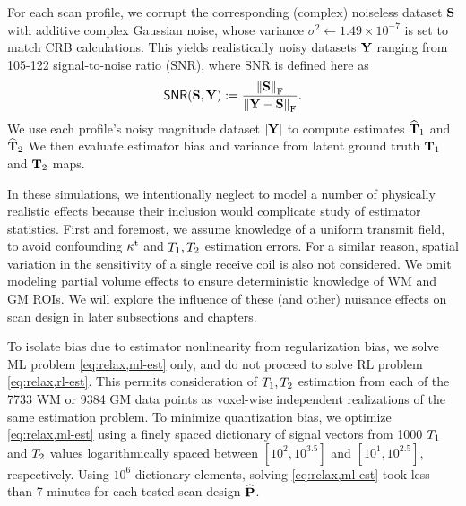 For each scan profile, 
we corrupt the corresponding (complex) noiseless dataset $\mathbf{S}$ 
with additive complex Gaussian noise, 
whose variance $\sigma^2 \gets 1.49 \times 10^{-7}$ 
is set to match CRB calculations. 
This yields realistically noisy datasets $\mathbf{Y}$ ranging 
from 105-122 signal-to-noise ratio (SNR), 
where SNR is defined here as
\begin{align}
	\snr{\bmS,\bmY} := \frac{\frob{\bmS}}{\frob{\bmY-\bmS}}.
	\label{eq:scn-dsgn,snr}
\end{align}
We use each profile's noisy magnitude dataset $\abs{\bmY}$
to compute estimates $\widehat{\mathbf{T}}_1$ and $\widehat{\mathbf{T}}_2$ 
We then evaluate estimator bias and variance 
from latent ground truth $\mathbf{T}_1$ and $\mathbf{T}_2$ maps.

In these simulations, 
we intentionally neglect to model 
a number of physically realistic effects 
because their inclusion 
would complicate study of estimator statistics. 
First and foremost, 
we assume knowledge 
of a uniform  transmit field, 
to avoid confounding $\kappa^{\mathrm{t}}$ and $T_1, T_2$ estimation errors. 
For a similar reason, 
spatial variation in the sensitivity 
of a single receive coil is also not considered. 
We omit modeling partial volume effects 
to ensure deterministic knowledge of WM and GM ROIs. 
We will explore the influence of these (and other) nuisance effects 
on scan design in later subsections and chapters. 

To isolate bias due to estimator nonlinearity 
from regularization bias, 
we solve ML problem \eqref{eq:relax,ml-est} only,
and do not proceed to solve RL problem \eqref{eq:relax,rl-est}.
This permits consideration of $T_1,T_2$ estimation 
from each of the 7733 WM or 9384 GM data points 
as voxel-wise independent realizations 
of the same estimation problem. 
To minimize quantization bias, 
we optimize \eqref{eq:relax,ml-est} using a finely spaced dictionary 
of signal vectors from 1000 $T_1$ and $T_2$ values 
logarithmically spaced between 
$[10^2, 10^{3.5}]$ and $[10^1, 10^{2.5}]$, respectively. 
Using $10^6$ dictionary elements, 
solving \eqref{eq:relax,ml-est} took less than 7 minutes 
for each tested scan design $\widehat{\mathbf{P}}$.

